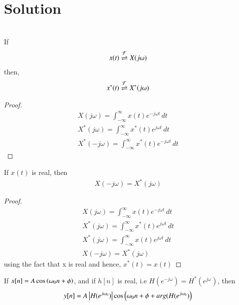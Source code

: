 \documentclass[journal,12pt,twocolumn]{IEEEtran}
\begin{document}
\section{Solution}

\begin{lemma}\\
If 
\begin{align}
    x(t) \overset{\mathcal{F}}{ \rightleftharpoons} X(j\omega)
\end{align}
then,
\begin{align}
    x^*(t) \overset{\mathcal{F}}{ \rightleftharpoons} X^*(j\omega)
\end{align}
\begin{proof}
\begin{align}
    X(j\omega) = \int_{-\infty}^\infty x(t) e^{-j\omega t} \,dt\\
     X^*(j\omega) = \int_{-\infty}^\infty x^*(t) e^{j\omega t} \,dt\\
      X^*(-j\omega) = \int_{-\infty}^\infty x^*(t) e^{-j\omega t} \,dt
\end{align}
\end{proof}
\end{lemma}

\begin{lemma}
If $x(t)$ is real, then 
\begin{align}
    X(-j\omega) = X^*(j\omega)
\end{align}
\begin{proof}
\begin{align}
    X(j\omega) = \int_{-\infty}^\infty x(t) e^{-j\omega t} \,dt\\
     X^*(j\omega) = \int_{-\infty}^\infty x^*(t) e^{j\omega t} \,dt\\
      X^*(j\omega) = \int_{-\infty}^\infty x(t) e^{j\omega t} \,dt\\
       X(-j\omega) = X^*(j\omega)
\end{align}
using the fact that x is real and hence, $x^*(t) = x(t)$
\end{proof}
\end{lemma}

\begin{lemma}
If $x[n] = A \cos \left(\omega_0 n + \phi\right)$, and if $h[n]$ is real, i.e $H(e^{-j\omega}) = H^*(e^{j\omega})$, then
\begin{align}
    y[n] = A \left\vert H(e^{j\omega_0})\right\vert\cos \left(\omega_0 n + \phi + arg(H(e^{j\omega_0})\right)
\end{align}
\label{ref}
\end{lemma}
\end{document}
